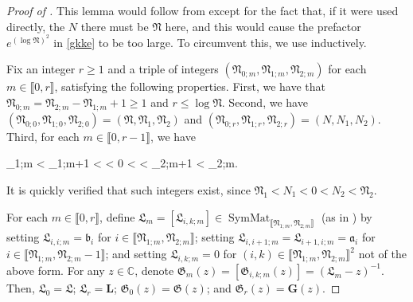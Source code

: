 \documentclass{amsart}
\numberwithin{equation}{section}
\DeclareMathOperator{\SymMat}{SymMat}
\theoremstyle{remark}
\theoremstyle{definition}
\begin{document}
	
	
	\begin{proof}[Proof of ]
		
		This lemma would follow from  except for the fact that, if it were used directly, the $N$ there must be $\mathfrak{N}$ here, and this would cause the prefactor $e^{(\log \mathfrak{N})^2}$ in \eqref{gkke} to be too large. To circumvent this, we use  inductively.
		
		Fix an integer $r \ge 1$ and a triple of integers $(\mathfrak{N}_{0;m}, \mathfrak{N}_{1;m}, \mathfrak{N}_{2;m})$ for each $m \in \llbracket 0, r \rrbracket$, satisfying the following properties. First, we have that $\mathfrak{N}_{0;m} = \mathfrak{N}_{2;m} - \mathfrak{N}_{1;m} + 1 \ge 1$ and $r \le \log \mathfrak{N}$. Second, we have $(\mathfrak{N}_{0;0}, \mathfrak{N}_{1;0}, \mathfrak{N}_{2;0}) = (\mathfrak{N}, \mathfrak{N}_1, \mathfrak{N}_2)$ and $(\mathfrak{N}_{0;r}, \mathfrak{N}_{1;r}, \mathfrak{N}_{2;r}) = (N, N_1, N_2)$. Third, for each $m \in \llbracket 0, r-1 \rrbracket$, we have 
		\begin{flalign}
			\label{nm} 
			_{1;m} < _{1;m+1} < \displaystyle{} < 0 < \displaystyle{} < _{2;m+1} < _{2;m}.
		\end{flalign} 
		
		\noindent It is quickly verified that such integers exist, since $\mathfrak{N}_1 < N_1 < 0 < N_2 < \mathfrak{N}_2$. 
		
		For each $m \in \llbracket 0, r \rrbracket$, define $\bm{\mathfrak{L}}_m = [\mathfrak{L}_{i,k;m}] \in \SymMat_{\llbracket \mathfrak{N}_{1;m}, \mathfrak{N}_{2;m} \rrbracket}$ (as in ) by setting $\mathfrak{L}_{i,i;m} = \mathfrak{b}_i$ for $i \in \llbracket \mathfrak{N}_{1;m}, \mathfrak{N}_{2;m} \rrbracket$; setting $\mathfrak{L}_{i,i+1;m} = \mathfrak{L}_{i+1,i;m} = \mathfrak{a}_i$ for $i \in \llbracket \mathfrak{N}_{1;m}, \mathfrak{N}_{2;m}-1 \rrbracket$; and setting $\mathfrak{L}_{i,k;m} = 0$ for $(i, k) \in \llbracket \mathfrak{N}_{1;m}, \mathfrak{N}_{2;m} \rrbracket^2$ not of the above form. For any $z \in \mathbb{C}$, denote $\bm{\mathfrak{G}}_m (z) = [ \mathfrak{G}_{i,k;m} (z) ] = (\bm{\mathfrak{L}}_m - z)^{-1}$. Then, $\bm{\mathfrak{L}}_0 = \bm{\mathfrak{L}}$; $\bm{\mathfrak{L}}_r = \bm{L}$; $\bm{\mathfrak{G}}_0 (z) = \bm{\mathfrak{G}} (z)$; and $\bm{\mathfrak{G}}_r (z) = \bm{G} (z)$. 
		

\end{proof}
\end{document}
